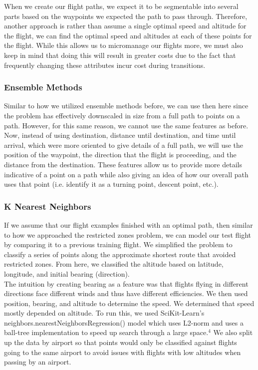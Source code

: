 \documentclass{article}[12pt]
\begin{document}
\begin{multicols}{2}
When we create our flight paths, we expect it to be segmentable into several parts based on the waypoints we expected the path to pass through. Therefore, another approach is rather than assume a single optimal speed and altitude for the flight, we can find the optimal speed and altitudes at each of these points for the flight. While this allows us to micromanage our flights more, we must also keep in mind that doing this will result in greater costs due to the fact that frequently changing these attributes incur cost during transitions.

\subsubsection{Ensemble Methods}

Similar to how we utilized ensemble methods before, we can use then here since the problem has effectively downscaled in size from a full path to points on a path. However, for this same reason, we cannot use the same features as before. Now, instead of using destination, distance until destination, and time until arrival, which were more oriented to give details of a full path, we will use the position of the waypoint, the direction that the flight is proceeding, and the distance from the destination. These features allow us to provide more details indicative of a point on a path while also giving an idea of how our overall path uses that point (i.e. identify it as a turning point, descent point, etc.).

\subsubsection{K Nearest Neighbors}

If we assume that our flight examples finished with an optimal path, then similar to how we approached the restricted zones problem, we can model our test flight by comparing it to a previous training flight. We simplified the problem to classify a series of points along the approximate shortest route that avoided restricted zones. From here, we classified the altitude based on latitude, longitude, and initial bearing (direction).\\

The intuition by creating bearing as a feature was that flights flying in different directions face different winds and thus have different efficiencies. We then used position, bearing, and altitude to determine the speed. We determined that speed mostly depended on altitude. To run this, we used SciKit-Learn's neighbors.nearestNeighborsRegression() model which uses L2-norm and uses a ball-tree implementation to speed up search through a large space.$^4$ We also split up the data by airport so that points would only be classified against flights going to the same airport to avoid issues with flights with low altitudes when passing by an airport.


\end{multicols}
\end{document}
